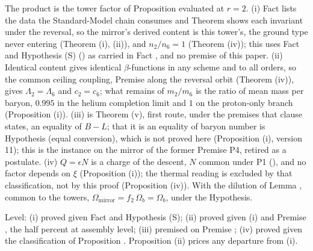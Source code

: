 The product is the tower factor of Proposition  evaluated at $r = 2$. (i) Fact  lists the data the Standard-Model chain consumes and Theorem  shows each invariant under the reversal, so the mirror's derived content is this tower's, the ground type never entering (Theorem (i), (ii)), and $n_{2}/n_{6} = 1$ (Theorem (iv)); this uses Fact  and Hypothesis (S) () as carried in Fact , and no premise of this paper. (ii) Identical content gives identical $\beta$-functions in any scheme and to all orders, so the common ceiling coupling, Premise  along the reversal orbit (Theorem (iv)), gives $\Lambda_{2} = \Lambda_{6}$ and $c_{2} = c_{6}$; what remains of $m_{2}/m_{6}$ is the ratio of mean mass per baryon, $0.995$ in the helium completion limit and $1$ on the proton-only branch (Proposition (i)). (iii) is Theorem (v), first route, under the premises that clause states, an equality of $B - L$; that it is an equality of baryon number is Hypothesis (equal conversion), which is not proved here (Proposition (i), version 11); this is the instance on the mirror of the former Premise P4, retired as a postulate. (iv) $Q = \epsilon N$ is a charge of the descent, $N$ common under P1 (), and no factor depends on $\xi$ (Proposition (i)); the thermal reading is excluded by that classification, not by this proof (Proposition (iv)). With the dilution of Lemma , common to the towers, $\Omega_{\mathrm{mirror}} = f_{2}\,\Omega_{b} = \Omega_{b}$, under the Hypothesis.

Level: (i) proved given Fact  and Hypothesis (S); (ii) proved given (i) and Premise , the half percent at assembly level; (iii) premised on Premise ; (iv) proved given the classification of Proposition . Proposition (ii) prices any departure from (i).
